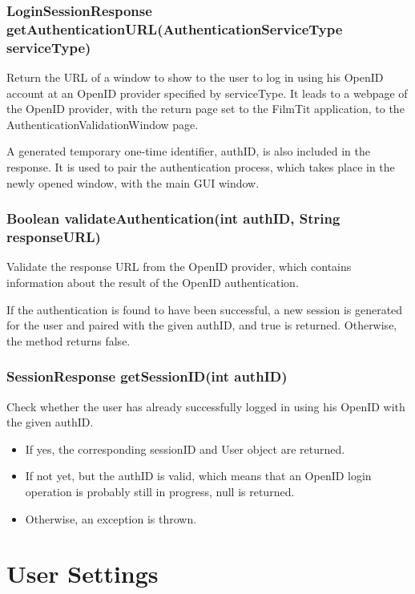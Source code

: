 \subsubsection{LoginSessionResponse getAuthenticationURL(AuthenticationServiceType serviceType)}

Return the URL of a window to show to the user to log in using his OpenID account at an OpenID provider specified by serviceType. It leads to a webpage of the OpenID provider, with the return page set to the FilmTit application, to the AuthenticationValidationWindow page.

A generated temporary one-time identifier, authID, is also included in the response. It is used to pair the authentication process, which takes place in the newly opened window, with the main GUI window.

\subsubsection{Boolean validateAuthentication(int authID, String responseURL)}

Validate the response URL from the OpenID provider, which contains information about the result of the OpenID authentication.

If the authentication is found to have been successful, a new session is generated for the user and paired with the given authID, and true is returned.
Otherwise, the method returns false.

\subsubsection{SessionResponse getSessionID(int authID)}

Check whether the user has already successfully logged in using his OpenID with the given authID.

\begin{itemize}
\item If yes, the corresponding sessionID and User object are returned.
\item If not yet, but the authID is valid, which means that an OpenID login operation is probably still in progress, null is returned.
\item Otherwise, an exception is thrown.
\end{itemize}

\section{User Settings}

